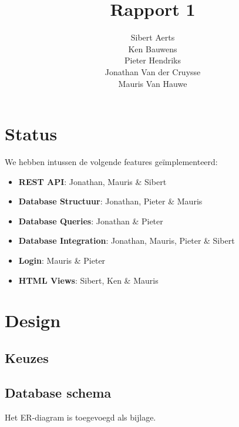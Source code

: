 \documentclass[12pt,a4paper]{article}
\begin{document}
\title{Rapport 1}
\author{Sibert Aerts \\ Ken Bauwens \\ Pieter Hendriks \\ Jonathan Van der Cruysse \\ Mauris Van Hauwe}
\maketitle

\newcommand{\code}[1]{\texttt{#1}}

\section{Status}

We hebben intussen de volgende features ge\"implementeerd:

\begin{itemize}

\item \textbf{REST API}: Jonathan, Mauris \& Sibert

\item \textbf{Database Structuur}: Jonathan, Pieter \& Mauris

\item \textbf{Database Queries}: Jonathan \& Pieter

\item \textbf{Database Integration}: Jonathan, Mauris, Pieter \& Sibert

\item \textbf{Login}: Mauris \& Pieter

\item \textbf{HTML Views}: Sibert, Ken \& Mauris

\end{itemize}

\section{Design}

\subsection{Keuzes}

\subsection{Database schema}
Het ER-diagram is toegevoegd als bijlage.
\end{document}
